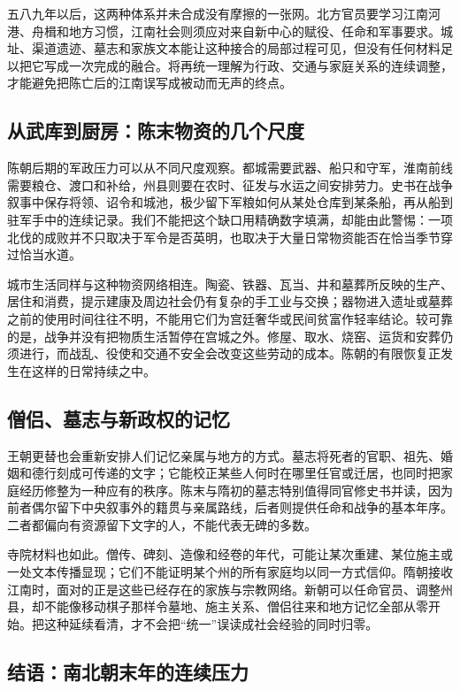 五八九年以后，这两种体系并未合成没有摩擦的一张网。北方官员要学习江南河港、舟楫和地方习惯，江南社会则须应对来自新中心的赋役、任命和军事要求。城址、渠道遗迹、墓志和家族文本能让这种接合的局部过程可见，但没有任何材料足以把它写成一次完成的融合。将再统一理解为行政、交通与家庭关系的连续调整，才能避免把陈亡后的江南误写成被动而无声的终点。

\subsection{从武库到厨房：陈末物资的几个尺度}

陈朝后期的军政压力可以从不同尺度观察。都城需要武器、船只和守军，淮南前线需要粮仓、渡口和补给，州县则要在农时、征发与水运之间安排劳力。史书在战争叙事中保存将领、诏令和城池，极少留下军粮如何从某处仓库到某条船，再从船到驻军手中的连续记录。我们不能把这个缺口用精确数字填满，却能由此警惕：一项北伐的成败并不只取决于军令是否英明，也取决于大量日常物资能否在恰当季节穿过恰当水道。

城市生活同样与这种物资网络相连。陶瓷、铁器、瓦当、井和墓葬所反映的生产、居住和消费，提示建康及周边社会仍有复杂的手工业与交换；器物进入遗址或墓葬之前的使用时间往往不明，不能用它们为宫廷奢华或民间贫富作轻率结论。较可靠的是，战争并没有把物质生活暂停在宫城之外。修屋、取水、烧窑、运货和安葬仍须进行，而战乱、役使和交通不安全会改变这些劳动的成本。陈朝的有限恢复正发生在这样的日常持续之中。

\subsection{僧侣、墓志与新政权的记忆}

王朝更替也会重新安排人们记忆亲属与地方的方式。墓志将死者的官职、祖先、婚姻和德行刻成可传递的文字；它能校正某些人何时在哪里任官或迁居，也同时把家庭经历修整为一种应有的秩序。陈末与隋初的墓志特别值得同官修史书并读，因为前者偶尔留下中央叙事外的籍贯与亲属路线，后者则提供任命和战争的基本年序。二者都偏向有资源留下文字的人，不能代表无碑的多数。

寺院材料也如此。僧传、碑刻、造像和经卷的年代，可能让某次重建、某位施主或一处文本传播显现；它们不能证明某个州的所有家庭均以同一方式信仰。隋朝接收江南时，面对的正是这些已经存在的家族与宗教网络。新朝可以任命官员、调整州县，却不能像移动棋子那样令墓地、施主关系、僧侣往来和地方记忆全部从零开始。把这种延续看清，才不会把“统一”误读成社会经验的同时归零。

\subsection{结语：南北朝末年的连续压力}

